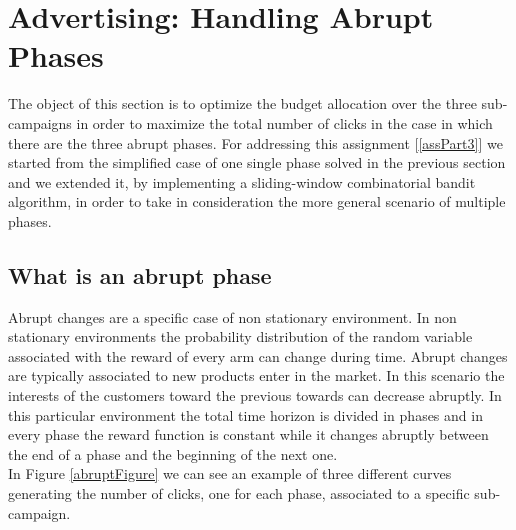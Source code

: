 \chapter{Advertising: Handling Abrupt Phases}

The object of this section is to optimize the budget allocation over the three sub-campaigns in order to maximize the total number of clicks in the case in which there are the three abrupt phases.
For addressing this assignment [\ref{assPart3}] we started from the simplified case of one single phase solved in the previous section and we extended it, by implementing a sliding-window combinatorial bandit algorithm, in order to take in consideration the more general scenario of multiple phases.\\

\section{What is an abrupt phase}
Abrupt changes are a specific case of non stationary environment.
In non stationary environments the probability distribution of the random variable associated with the reward of every arm can change during time.
Abrupt changes are typically associated to new products enter in the market. In this scenario the interests of the customers toward the previous towards can decrease abruptly.
In this particular environment the total time horizon is divided in phases and in every phase the reward function is constant while it changes abruptly between the end of a phase and the beginning of the next one.\\ In Figure \ref{abruptFigure} we can see an example of three different curves generating  the number of clicks, one for each phase, associated to a specific sub-campaign.
